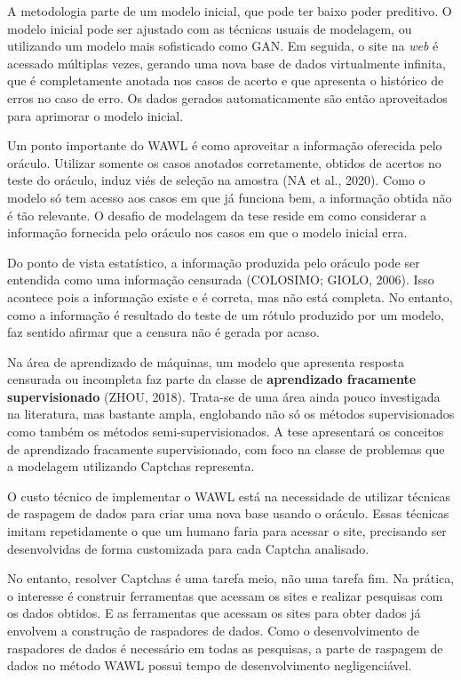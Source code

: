 \documentclass[12pt,twoside,brazilian]{book}
\begin{document}
A metodologia parte de um modelo inicial, que pode ter baixo poder
preditivo. O modelo inicial pode ser ajustado com as técnicas usuais de
modelagem, ou utilizando um modelo mais sofisticado como GAN. Em
seguida, o site na \emph{web} é acessado múltiplas vezes, gerando uma
nova base de dados virtualmente infinita, que é completamente anotada
nos casos de acerto e que apresenta o histórico de erros no caso de
erro. Os dados gerados automaticamente são então aproveitados para
aprimorar o modelo inicial.

Um ponto importante do WAWL é como aproveitar a informação oferecida
pelo oráculo. Utilizar somente os casos anotados corretamente, obtidos
de acertos no teste do oráculo, induz viés de seleção na amostra (NA et
al., 2020). Como o modelo só tem acesso aos casos em que já funciona
bem, a informação obtida não é tão relevante. O desafio de modelagem da
tese reside em como considerar a informação fornecida pelo oráculo nos
casos em que o modelo inicial erra.

Do ponto de vista estatístico, a informação produzida pelo oráculo pode
ser entendida como uma informação censurada (COLOSIMO; GIOLO, 2006).
Isso acontece pois a informação existe e é correta, mas não está
completa. No entanto, como a informação é resultado do teste de um
rótulo produzido por um modelo, faz sentido afirmar que a censura não é
gerada por acaso.

Na área de aprendizado de máquinas, um modelo que apresenta resposta
censurada ou incompleta faz parte da classe de \textbf{aprendizado
fracamente supervisionado} (ZHOU, 2018). Trata-se de uma área ainda
pouco investigada na literatura, mas bastante ampla, englobando não só
os métodos supervisionados como também os métodos semi-supervisionados.
A tese apresentará os conceitos de aprendizado fracamente
supervisionado, com foco na classe de problemas que a modelagem
utilizando Captchas representa.

O custo técnico de implementar o WAWL está na necessidade de utilizar
técnicas de raspagem de dados para criar uma nova base usando o oráculo.
Essas técnicas imitam repetidamente o que um humano faria para acessar o
site, precisando ser desenvolvidas de forma customizada para cada
Captcha analisado.

No entanto, resolver Captchas é uma tarefa meio, não uma tarefa fim. Na
prática, o interesse é construir ferramentas que acessam os sites e
realizar pesquisas com os dados obtidos. E as ferramentas que acessam os
sites para obter dados já envolvem a construção de raspadores de dados.
Como o desenvolvimento de raspadores de dados é necessário em todas as
pesquisas, a parte de raspagem de dados no método WAWL possui tempo de
desenvolvimento negligenciável.
\end{document}
